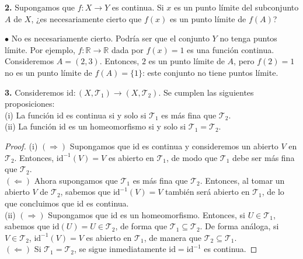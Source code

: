 \documentclass{article}
\begin{document}
\begin{mybox}
	\textbf{2. }  Supongamos que $f: X \rightarrow Y$ es continua. Si $x$ es un punto límite del subconjunto $A$ de $X$, ¿es necesariamente cierto que $f(x)$ es un punto límite de $f(A)$? 
\end{mybox}	

$\bullet$ No es necesariamente cierto. Podría ser que el conjunto $Y$ no tenga puntos límite. Por ejemplo, $f: \mathbb{R} \rightarrow \mathbb{R}$ dada por $f(x) = 1$ es una función continua. Consideremos $A = (2,3)$.  Entonces, $2$ es un punto límite de $A$, pero $f(2) = 1$ no es un punto límite de $f(A) = \{ 1 \}$: este conjunto no tiene puntos límite. 

\begin{mybox}
	\textbf{3. } Consideremos $\text{id}: (X, \mathcal{T}_{1}) \rightarrow (X, \mathcal{T}_{2})$. Se cumplen las siguientes proposiciones: \\
	
	(i) La función $\text{id}$ es continua si y solo si $\mathcal{T}_{1}$ es más fina que $\mathcal{T}_{2}$. \\
	
	(ii) La función id es un homeomorfismo si y solo si $\mathcal{T}_{1} = \mathcal{T}_{2}$.  
\end{mybox}	
\begin{proof}
	(i) $(\Rightarrow)$ Supongamos que id es continua y consideremos un abierto $V$ en $\mathcal{T}_{2}$. Entonces, $\text{id}^{-1}(V) = V$ es abierto en $\mathcal{T}_{1}$, de modo que $\mathcal{T}_{1}$ debe ser más fina que $\mathcal{T}_{2}$. \\
	$(\Leftarrow)$ Ahora supongamos que $\mathcal{T}_{1}$ es más fina que $\mathcal{T}_{2}$. Entonces, al tomar un abierto $V$ de $\mathcal{T}_{2}$, sabemos que $\text{id}^{-1}(V) = V$ también será abierto en $\mathcal{T}_{1}$, de lo que concluimos que id es continua. \\
	
	(ii) $(\Rightarrow)$ Supongamos que id es un homeomorfismo. Entonces, si $U \in \mathcal{T}_{1}$, sabemos que $\text{id}(U) = U \in \mathcal{T}_{2}$, de forma que $\mathcal{T}_{1} \subseteq \mathcal{T}_{2}$.   De forma análoga, si $V \in \mathcal{T}_{2}$, $\text{id}^{-1}(V) = V$ es abierto en $\mathcal{T}_{1}$, de manera que $\mathcal{T}_{2} \subseteq \mathcal{T}_{1}$. \\
	$(\Leftarrow)$ Si $\mathcal{T}_{1} = \mathcal{T}_{2}$, se sigue inmediatamente $\text{id} = \text{id}^{-1}$ es continua.  
\end{proof}
\end{document}
